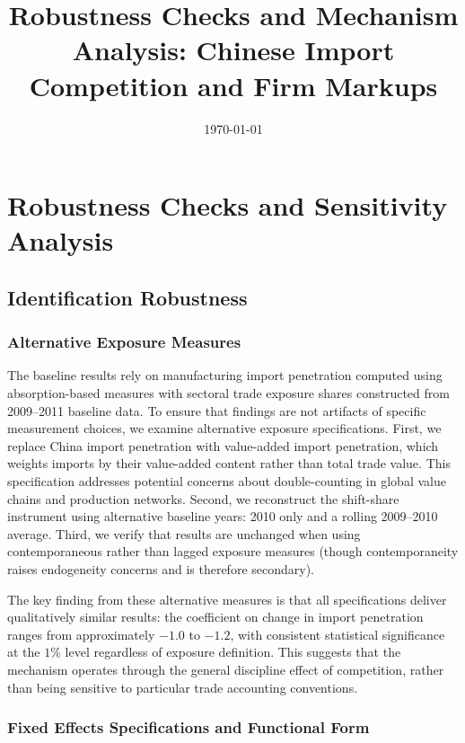 \documentclass[12pt]{article}
\title{Robustness Checks and Mechanism Analysis: Chinese Import Competition and Firm Markups}
\author{}
\date{\today}
\begin{document}

\section{Robustness Checks and Sensitivity Analysis}

\subsection{Identification Robustness}

\subsubsection{Alternative Exposure Measures}

The baseline results rely on manufacturing import penetration computed using absorption-based measures with sectoral trade exposure shares constructed from 2009--2011 baseline data. To ensure that findings are not artifacts of specific measurement choices, we examine alternative exposure specifications. First, we replace China import penetration with value-added import penetration, which weights imports by their value-added content rather than total trade value. This specification addresses potential concerns about double-counting in global value chains and production networks. Second, we reconstruct the shift-share instrument using alternative baseline years: 2010 only and a rolling 2009--2010 average. Third, we verify that results are unchanged when using contemporaneous rather than lagged exposure measures (though contemporaneity raises endogeneity concerns and is therefore secondary).

The key finding from these alternative measures is that all specifications deliver qualitatively similar results: the coefficient on change in import penetration ranges from approximately $-1.0$ to $-1.2$, with consistent statistical significance at the $1\%$ level regardless of exposure definition. This suggests that the mechanism operates through the general discipline effect of competition, rather than being sensitive to particular trade accounting conventions.

\subsubsection{Fixed Effects Specifications and Functional Form}
\end{document}
